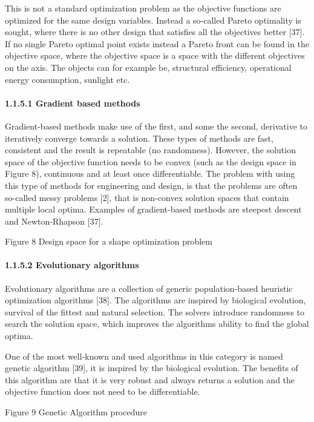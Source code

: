 This is not a standard optimization problem as the objective functions are optimized for the same design variables. Instead a so-called Pareto optimality is sought, where there is no other design that satisfies all the objectives better [37]. If no single Pareto optimal point exists instead a Pareto front can be found in the objective space, where the objective space is a space with the different objectives on the axis. The objects can for example be, structural efficiency, operational energy consumption, sunlight etc.

\paragraph[1.1.5.1 Gradient based methods]{1.1.5.1 Gradient based methods}
Gradient-based methods make use of the first, and some the second, derivative to iteratively converge towards a solution. These types of methods are fast, consistent and the result is repeatable (no randomness). However, the solution space of the objective function needs to be convex (such as the design space in Figure 8), continuous and at least once differentiable. The problem with using this type of methods for engineering and design, is that the problems are often so-called messy problems [2], that is non-convex solution spaces that contain multiple local optima. Examples of gradient-based methods are steepest descent and Newton-Rhapson [37]. 

Figure 8 Design space for a shape optimization problem

\paragraph[1.1.5.2 Evolutionary algorithms]{1.1.5.2 Evolutionary algorithms}
Evolutionary algorithms are a collection of generic population-based heuristic optimization algorithms [38]. The algorithms are inspired by biological evolution, survival of the fittest and natural selection. The solvers introduce randomness to search the solution space, which improves the algorithms ability to find the global optima.



One of the most well-known and used algorithms in this category is named genetic algorithm [39], it is inspired by the biological evolution. The benefits of this algorithm are that it is very robust and always returns a solution and the objective function does not need to be differentiable. 

Figure 9 Genetic Algorithm procedure

